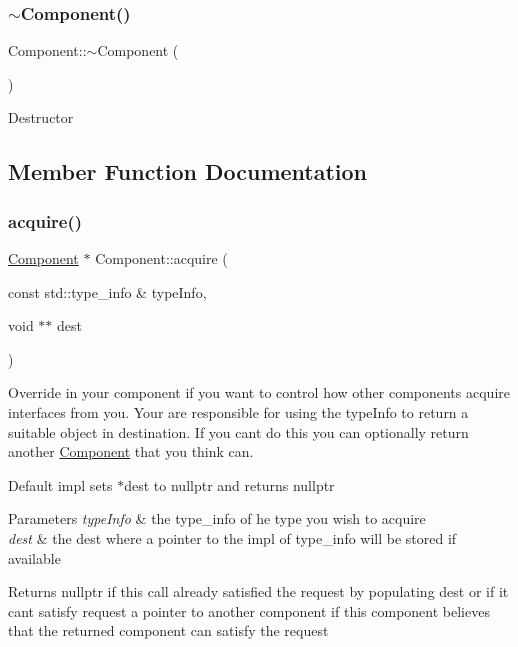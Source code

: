 \subsubsection{\texorpdfstring{$\sim$\+Component()}{~Component()}}
{\footnotesize\ttfamily Component\+::$\sim$\+Component (\begin{DoxyParamCaption}{ }\end{DoxyParamCaption})\hspace{0.3cm}{\ttfamily [virtual]}}

Destructor 

\subsection{Member Function Documentation}
\mbox{\label{classtheoria_1_1core_1_1Component_a18744abc83e088af3c3d42e0a22c35e3}} 
\subsubsection{\texorpdfstring{acquire()}{acquire()}}
{\footnotesize\ttfamily \hyperlink{classtheoria_1_1core_1_1Component}{Component} $\ast$ Component\+::acquire (\begin{DoxyParamCaption}\item[{const std\+::type\+\_\+info \&}]{type\+Info,  }\item[{void $\ast$$\ast$}]{dest }\end{DoxyParamCaption})\hspace{0.3cm}{\ttfamily [virtual]}}

Override in your component if you want to control how other components acquire interfaces from you. Your are responsible for using the type\+Info to return a suitable object in destination. If you can\textquotesingle{}t do this you can optionally return another \hyperlink{classtheoria_1_1core_1_1Component}{Component} that you think can.

Default impl sets $\ast$dest to nullptr and returns nullptr


\begin{DoxyParams}{Parameters}
{\em type\+Info} & the type\+\_\+info of he type you wish to acquire \\
\hline
{\em dest} & the dest where a pointer to the impl of type\+\_\+info will be stored if available \\
\hline
\end{DoxyParams}
\begin{DoxyReturn}{Returns}
nullptr if this call already satisfied the request by populating dest or if it can\textquotesingle{}t satisfy request a pointer to another component if this component believes that the returned component can satisfy the request 
\end{DoxyReturn}


